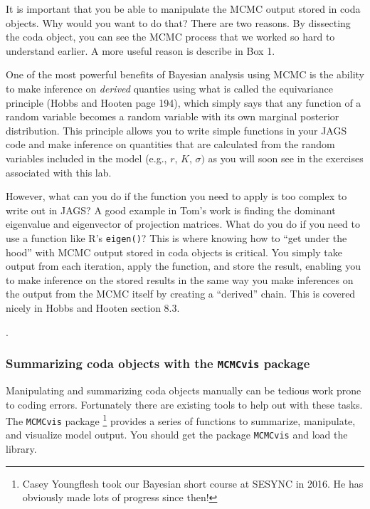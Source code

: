 \documentclass[12pt,english]{article}
\begin{document}
It is important that you be able to manipulate the MCMC output stored in coda objects. Why would you want to do that? There are two reasons. By dissecting the coda object, you can see the MCMC process that we worked so hard to understand earlier. A more useful reason is describe in Box 1.

\newpage 

\begin{mdframed}[frametitle={Box 1: Using R to calculate derived quantities from MCMC objects}, backgroundcolor=black!10]
One of the most powerful benefits of Bayesian analysis using MCMC is the ability to make inference on \emph{derived} quanties using what is called the equivariance principle (Hobbs and Hooten \citeyearpar{hobbs2015bayesian} page 194), which simply says that any function of a random variable becomes a random variable with its own marginal posterior distribution. This principle allows you to write simple functions in your JAGS code and make inference on quantities that are calculated from the random variables included in the model (e.g., $r$, $K$, $\sigma)$ as you will soon see in the exercises associated with this lab. 

\noindent However, what can you do if the function you need to apply is too complex to write out in JAGS? A good example in Tom's work is finding the dominant eigenvalue and eigenvector of projection matrices. What do you do if you need to use a function like R's \texttt{eigen()}? This is where knowing how to ``get under the hood'' with MCMC output stored in coda objects is critical. You simply take output from each iteration, apply the function, and store the result, enabling you to make inference on the stored results in the same way you make inferences on the output from the MCMC itself by creating a ``derived'' chain. This is covered nicely in Hobbs and Hooten \citeyearpar{hobbs2015bayesian} section 8.3.

\end{mdframed}.  


\subsubsection{Summarizing coda objects with the \texttt{MCMCvis} package}

Manipulating and summarizing coda objects manually can be tedious work prone to coding errors. Fortunately there are existing tools to help out with these tasks. The \texttt{MCMCvis} package \citep{youngflesh2018}\footnote{Casey Youngflesh took our Bayesian short course at SESYNC in 2016. He has obviously made lots of progress since then!} provides a series of functions to summarize, manipulate, and visualize model output.  You should get the package  \texttt{MCMCvis} and load the library.
\end{document}
